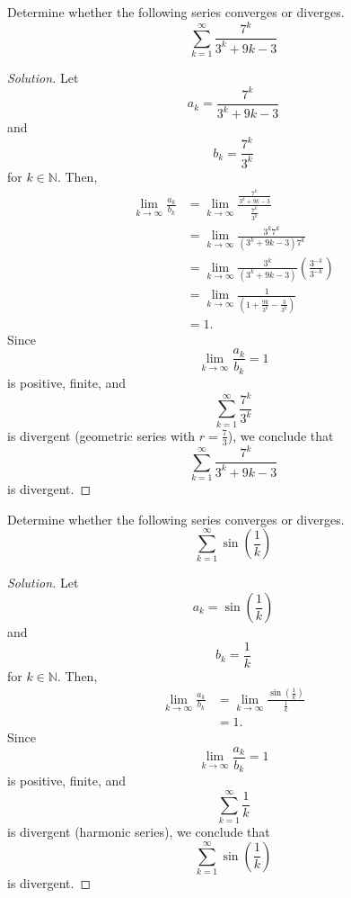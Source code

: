 \documentclass[compacto,10pt,comentarios]{aleph-notas}
\begin{document}
\begin{ejer}
    Determine whether the following series converges or diverges.
    $$
        \sum_{k=1}^{\infty} \frac{7^{k}}{3^{k} + 9k  - 3}
    $$
\end{ejer}
\begin{proof}[Solution]
    Let
    $$
        a_k = \frac{7^{k}}{3^{k} + 9k  - 3}
    $$
    and
    $$
        b_k = \frac{7^{k}}{3^{k}} 
    $$
    for $ k \in \mathbb{N}$. Then,
    \begin{align*}
        \lim_{k \to \infty} \frac{a_k}{b_k}
            & = \lim_{k \to \infty} \frac{\frac{7^{k}}{3^{k} + 9k  - 3}}{\frac{7^{k}}{3^{k}} } \\
            & = \lim_{k \to \infty} \frac{3^{k}7^{k}}{(3^{k} + 9k -3)7^{k}} \\
            & = \lim_{k \to \infty} \frac{3^{k}}{(3^{k} + 9k -3)} \left( \frac{3^{-k}}{3^{-k}} \right) \\
            & = \lim_{k \to \infty} \frac{1}{(1 + \frac{9k}{3^{k}} - \frac{3}{3^{k}})} \\
            & = 1.
    \end{align*}
    Since 
    $$
    \lim_{k \to \infty} \frac{a_k}{b_k} = 1
    $$
    is positive, finite, and
    $$
        \sum_{k=1}^{\infty} \frac{7^{k}}{3^{k}}
    $$
    is divergent (geometric series with $r=\frac{7}{3}$), we conclude that 
    $$
        \sum_{k=1}^{\infty} \frac{7^{k}}{3^{k} + 9k  - 3}
    $$
    is divergent.
\end{proof}

\begin{ejer}
    Determine whether the following series converges or diverges.
    $$
        \sum_{k=1}^{\infty} \sin\left( \frac{1}{k} \right)
    $$
\end{ejer}
\begin{proof}[Solution]
    Let
    $$
        a_k = \sin\left( \frac{1}{k} \right)
    $$
    and
    $$
        b_k = \frac{1}{k}
    $$
    for $ k \in \mathbb{N}$. Then,
    \begin{align*}
        \lim_{k \to \infty} \frac{a_k}{b_k}
            & = \lim_{k \to \infty} \frac{\sin\left( \frac{1}{k}\right)}{\frac{1}{k}} \\
            & = 1.
    \end{align*}
    Since 
    $$
    \lim_{k \to \infty} \frac{a_k}{b_k} = 1
    $$
    is positive, finite, and
    $$
        \sum_{k=1}^{\infty} \frac{1}{k}
    $$
    is divergent (harmonic series), we conclude that 
    $$
        \sum_{k=1}^{\infty} \sin\left( \frac{1}{k} \right)
    $$
    is divergent.
\end{proof}
\end{document}
